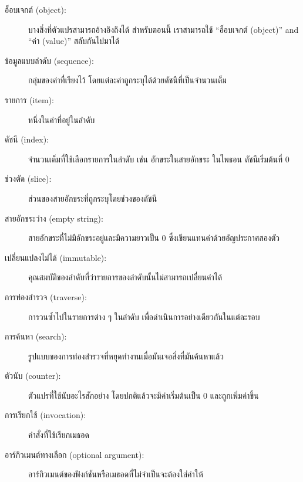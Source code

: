 \begin{description}

\item[อ็อบเจกต์ (object):] บางสิ่งที่ตัวแปรสามารถอ้างอิงถึงได้ สำหรับตอนนี้ เราสามารถใช้
``อ็อบเจกต์ (object)'' and ``ค่า (value)'' สลับกันไปมาได้

\item[ข้อมูลแบบลำดับ (sequence):] กลุ่มของค่าที่เรียงไว้ โดยแต่ละค่าถูกระบุได้ด้วยดัชนีที่เป็นจำนวนเต็ม

\item[รายการ (item):] หนึ่งในค่าที่อยู่ในลำดับ

\item[ดัชนี (index):] จำนวนเต็มที่ใช้เลือกรายการในลำดับ เช่น อักขระในสายอักขระ ในไพธอน
ดัชนีเริ่มต้นที่ 0 

\item[ช่วงตัด (slice):] ส่วนของสายอักขระที่ถูกระบุโดยช่วงของดัชนี 

\item[สายอักขระว่าง (empty string):] สายอักขระที่ไม่มีอักขระอยู่และมีความยาวเป็น 0 ซึ่งเขียนแทนค่าด้วยอัญประกาศสองตัว

\item[เปลี่ยนแปลงไม่ได้ (immutable):] คุณสมบัติของลำดับที่ว่ารายการของลำดับนั้นไม่สามารถเปลี่ยนค่าได้ 

\item[การท่องสำรวจ (traverse):] การวนซ้ำไปในรายการต่าง ๆ ในลำดับ เพื่อดำเนินการอย่างเดียวกันในแต่ละรอบ

\item[การค้นหา (search):] รูปแบบของการท่องสำรวจที่หยุดทำงานเมื่อมันเจอสิ่งที่มันค้นหาแล้ว

\item[ตัวนับ (counter):] ตัวแปรที่ใช้นับอะไรสักอย่าง โดยปกติแล้วจะมีค่าเริ่มต้นเป็น 0 และถูกเพิ่มค่าขึ้น

\item[การเรียกใช้ (invocation):] คำสั่งที่ใช้เรียกเมธอด

\item[อาร์กิวเมนต์ทางเลือก (optional argument):] อาร์กิวเมนต์ของฟังก์ชันหรือเมธอดที่ไม่จำเป็นจะต้องใส่ค่าให้

\end{description}


